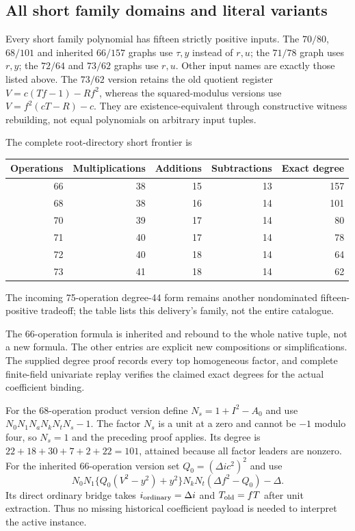 \subsection{All short family domains and literal variants}
Every short family polynomial has fifteen strictly positive inputs. The
$70/80$, $68/101$ and inherited $66/157$ graphs use $\tau,y$ instead of
$r,u$; the $71/78$ graph uses $r,y$; the $72/64$ and $73/62$ graphs use
$r,u$. Other input names are exactly those listed above. The $73/62$
version retains the old quotient register
$V=c(Tf-1)-Rf^2$, whereas the squared-modulus versions use
$V=f^2(cT-R)-c$. They are existence-equivalent through constructive witness
rebuilding, not equal polynomials on arbitrary input tuples.

The complete root-directory short frontier is
\begin{center}
\begin{tabular}{rrrrr}
\toprule
Operations & Multiplications & Additions & Subtractions & Exact degree\\
\midrule
66 &38&15&13&157\\
68 &38&16&14&101\\
70 &39&17&14&80\\
71 &40&17&14&78\\
72 &40&18&14&64\\
73 &41&18&14&62\\
\bottomrule
\end{tabular}
\end{center}
The incoming 75-operation degree-44 form remains another nondominated
fifteen-positive tradeoff; the table lists this delivery's family, not the
entire catalogue.

The 66-operation formula is inherited and rebound to the whole native tuple,
not a new formula. The other entries are explicit new compositions or
simplifications. The supplied degree proof records every top homogeneous
factor, and complete finite-field univariate replay verifies the claimed
exact degrees for the actual coefficient binding.

For the 68-operation product version define $N_s=1+I^2-A_0$ and use
$N_0N_1N_aN_kN_tN_s-1$. The factor $N_s$ is a unit at a zero and cannot
be $-1$ modulo four, so $N_s=1$ and the preceding proof applies. Its degree
is $22+18+30+7+2+22=101$, attained because all factor leaders are nonzero.
For the inherited 66-operation version set
$Q_0=(\Delta ic^2)^2$ and use
\[
 N_0N_1\{Q_0(V^2-y^2)+y^2\}N_kN_t(\Delta f^2-Q_0)-\Delta.
\]
Its direct ordinary bridge takes $i_{\rm ordinary}=\Delta i$ and
$T_{\rm old}=fT$ after unit extraction. Thus no missing historical coefficient
payload is needed to interpret the active instance.

